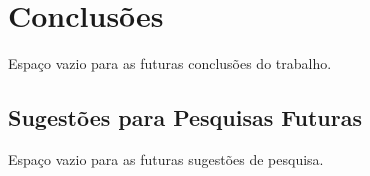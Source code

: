 \chapter{Conclusões}
\label{cap:conclusoes}

Espaço vazio para as futuras conclusões do trabalho.

\section{Sugestões para Pesquisas Futuras} 

Espaço vazio para as futuras sugestões de pesquisa.